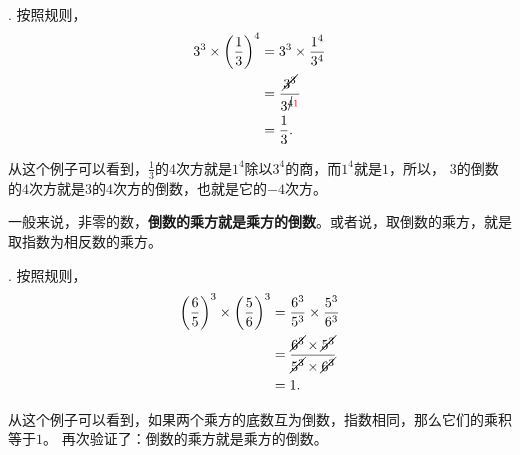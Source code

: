 \documentclass[12pt,UTF8,fontset=none]{ctexbook}
\begin{document}
\begin{so}
    \mbox{} \\
    . 按照规则，
    \begin{align*}
        3^3 \times \left(\frac{1}{3}\right)^4 &= 3^3\times \frac{1^4}{3^4} \\
        &= \frac{\cancel{3^3}}{3^{\cancel{4}{\color{red} 1}}} \\
        &= \frac{1}{3}.
    \end{align*}
    
    从这个例子可以看到，$\frac{1}{3}$的$4$次方就是$1^4$除以$3^4$的商，而$1^4$就是$1$，所以，
    $3$的倒数的$4$次方就是$3$的$4$次方的倒数，也就是它的$-4$次方。

    一般来说，非零的数，\textbf{倒数的乘方就是乘方的倒数}。或者说，取倒数的乘方，就是取指数为相反数的乘方。

    . 按照规则，
    \begin{align*}
        \left(\frac{6}{5}\right)^3\times \left(\frac{5}{6}\right)^3 &= \frac{6^3}{5^3}\times \frac{5^3}{6^3} \\
        &= \frac{\cancel{6^3}\times \cancel{5^3}}{\cancel{5^3}\times \cancel{6^3}} \\
        &= 1.
    \end{align*}

    从这个例子可以看到，如果两个乘方的底数互为倒数，指数相同，那么它们的乘积等于$1$。
    再次验证了：倒数的乘方就是乘方的倒数。
    

\end{so}
\end{document}
